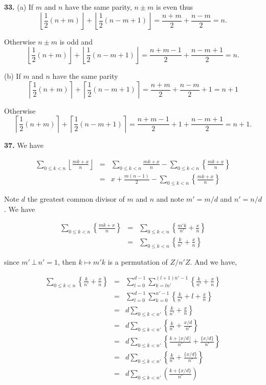 \documentclass[a4paper,12pt]{article}
\newcommand{\newpar}[1]{\bigskip \noindent \textbf{#1.}}
\newcommand{\subpar}[1]{\medskip \noindent (#1)}
\begin{document}
\newpar{33} \subpar{a}  If $m$ and $n$ have the same parity, $n
\pm m$ is even thus
\[\left\lfloor \frac{1}{2}(n+m)\right\rfloor + \left\lfloor
\frac{1}{2}(n-m+1)\right\rfloor = \frac{n+m}{2} + \frac{n-m}{2} = n.\]

Otherwise $n\pm m$ is odd and
\[\left\lfloor \frac{1}{2}(n+m)\right\rfloor + \left\lfloor
\frac{1}{2}(n-m+1)\right\rfloor = \frac{n+m-1}{2} + \frac{n-m+1}{2} =
n.\]

\subpar{b} If $m$ and $n$ have the same parity
\[\left\lceil \frac{1}{2}(n+m)\right\rceil + \left\lceil
\frac{1}{2}(n-m+1) \right\rceil = \frac{n+m}{2} + \frac{n-m}{2} + 1 =
n+1\]

Otherwise
\[\left\lceil \frac{1}{2}(n+m)\right\rceil + \left\lceil
\frac{1}{2}(n-m+1) \right\rceil = \frac{n+m-1}{2} + 1 +
\frac{n-m+1}{2} = n+1.\]

\newpar{37} We have

\begin{eqnarray*}
  \sum_{0\le k<n}\left\lfloor \frac{mk + x}{n}\right\rfloor &=&
  \sum_{0\le k<n}\frac{mk+x}{n} - \sum_{0\le k<n}\left\{
  \frac{mk+x}{n}\right\} \\ &=&
  x + \frac{m(n-1)}{2} - \sum_{0\le k<n}\left\{\frac{mk+x}{n}\right\}
\end{eqnarray*}

Note $d$ the greatest common divisor of $m$ and $n$ and note $m' =
m/d$ and $n' = n/d$.  We have

\begin{eqnarray*}
  \sum_{0\le k<n}\left\{ \frac{mk+x}{n} \right\} &=& \sum_{0\le k<n}
  \left\{ \frac{m'k}{n'} + \frac{x}{n} \right\} \\
  &=& \sum_{0\le k<n}\left\{ \frac{k}{n'} + \frac{x}{n} \right\}
\end{eqnarray*}

since $m'\,\bot\,n' = 1$, then $k \mapsto m'k$ is a permutation of
$Z/n'Z$.  And we have,

\begin{eqnarray*}
  \sum_{0\le k<n}\left\{ \frac{k}{n'} + \frac{x}{n} \right\} &=&
  \sum_{l=0}^{d-1}\sum_{k=ln'}^{(l+1)n'-1} \left\{ \frac{k}{n'} +
  \frac{x}{n} \right\} \\ &=&
  \sum_{l=0}^{d-1}\sum_{k=0}^{n'-1}\left\{ \frac{k}{n'} + l +
  \frac{x}{n} \right\} \\ &=&
  d \sum_{0\le k <n'}\left\{ \frac{k}{n'} + \frac{x}{n}\right\} \\ &=&
  d \sum_{0\le k<n'} \left\{ \frac{k}{n'} + \frac{x/d}{n'}\right\}
  \\ &=& d \sum_{0\le k<n'}\left\{ \frac{k + \lfloor x/d\rfloor}{n'} +
  \frac{\{ x/d \}}{n'}\right\} \\ &=&
  d \sum_{0\le k<n'}\left\{ \frac{k}{n'} + \frac{\{x/d\}}{n'} \right\}
  \\ &=& d \sum_{0\le k<n'} \left( \frac{k + \{x/d\}}{n'} \right)
\end{eqnarray*}
\end{document}
